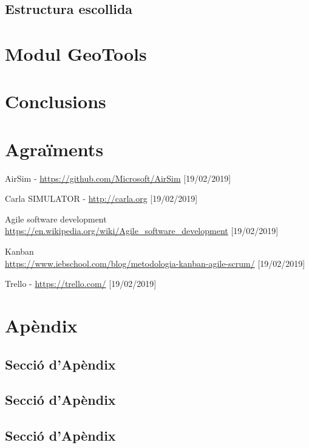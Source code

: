 \documentclass[10pt,a4paper,twocolumn,twoside]{article}
\begin{document}
\subsection{Estructura escollida}


\section{Modul GeoTools}


\section{Conclusions}


\section*{Agraïments}


\begin{thebibliography}{11}
AirSim - \url{https://github.com/Microsoft/AirSim} [19/02/2019]


Carla SIMULATOR - \url{http://carla.org} [19/02/2019]

Agile software development
\\ \url{https://en.wikipedia.org/wiki/Agile_software_development}
[19/02/2019]

Kanban
\\ \url{https://www.iebschool.com/blog/metodologia-kanban-agile-scrum/} [19/02/2019]

Trello - \url{https://trello.com/} [19/02/2019]


\end{thebibliography}

\appendix

\section*{Apèndix}

\setcounter{section}{1}

\subsection{Secció d'Apèndix}
\subsection{Secció d'Apèndix}
\subsection{Secció d'Apèndix}
\end{document}
